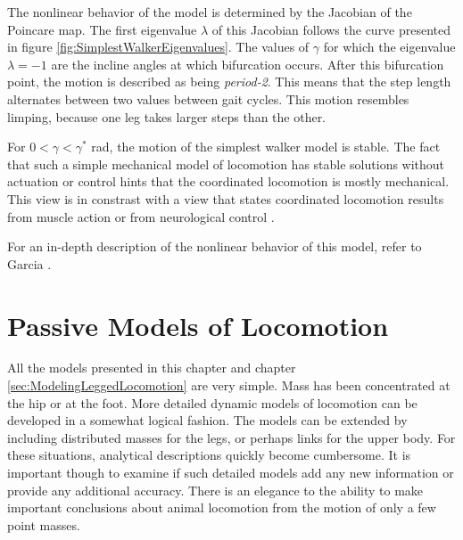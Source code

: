 The nonlinear behavior of the model is determined by the Jacobian of the
Poincare map. The first eigenvalue $\lambda$ of this Jacobian follows the curve
presented in figure \ref{fig:SimplestWalkerEigenvalues}. The values of $\gamma$
for which the eigenvalue $\lambda = -1$ are the incline angles at which
bifurcation occurs. After this bifurcation point, the motion is described as
being \textit{period-2}. This means that the step length alternates between two
values between gait cycles. This motion resembles limping, because one leg
takes larger steps than the other.

For $0 < \gamma < \gamma^{*}$ rad, the motion of the simplest walker model is
stable. The fact that such a simple mechanical model of locomotion has stable
solutions without actuation or control hints that the coordinated locomotion is
mostly mechanical. This view is in constrast with a view that states
coordinated locomotion results from muscle action or from neurological control
\cite{garcia97}.

For an in-depth description of the nonlinear behavior of this model, 
refer to Garcia \cite{garcia97}.


\section*{Passive Models of Locomotion}

All the models presented in this chapter and chapter
\ref{sec:ModelingLeggedLocomotion} are very simple. Mass has been concentrated
at the hip or at the foot. More detailed dynamic models of locomotion can be
developed in a somewhat logical fashion. The models can be extended by
including distributed masses for the legs, or perhaps links for the upper body.
For these situations, analytical descriptions quickly become cumbersome. It is
important though to examine if such detailed models add any new information or
provide any additional accuracy. There is an elegance to the ability to make
important conclusions about animal locomotion from the motion of only a few
point masses.

